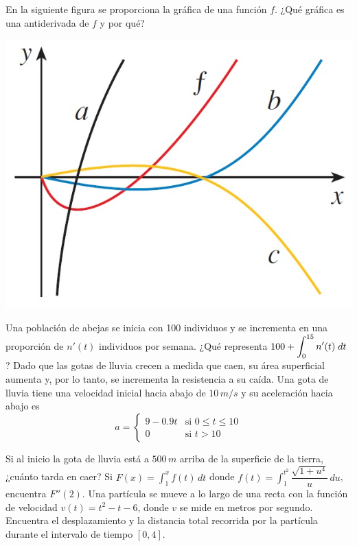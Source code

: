 \documentclass[12pt]{exam}
\begin{document}
\begin{questions}
    \question En la siguiente figura se proporciona la gráfica de una función $f$. ¿Qué gráfica es una antiderivada de $f$ y por qué?
    \begin{center}
      \includegraphics[scale=0.55]{curvas antiderivadas.jpg}   
    \end{center}
   
\vskip10pt

    \question Una población de abejas se inicia con 100 individuos y se incrementa en una proporción de $n'(t)$ individuos por semana. ¿Qué representa $100+\mathlarger{\int_0^{15}n'(t)\;dt}$?
    \vskip10pt
    \question Dado que las gotas de lluvia crecen a medida que caen, su área superficial aumenta y, por lo tanto, se incrementa la resistencia a su caída. Una gota de lluvia tiene una velocidad inicial hacia abajo de \(10\, m/s\) y su aceleración hacia abajo es
$$ a = \begin{cases} 9-0.9t & \text{si } 0\leq t \leq 10 \\0 & \text{si } t > 10\end{cases} $$

Si al inicio la gota de lluvia está a $500\, m$ arriba de la superficie de la tierra, ¿cuánto tarda en caer?
 \vskip12pt   
    \question Si $F(x)=\displaystyle \int_1^x f(t)\,dt$ donde $f(t)=\displaystyle \int_1^{t^2}\dfrac{\sqrt{1+u^4}}{u}\,du$, encuentra $F''(2)$.
\vskip12pt
\question Una partícula se mueve a lo largo de una recta con la función de velocidad $v(t)=t^2-t-6$, donde $v$ se mide en metros por segundo. Encuentra el desplazamiento y la distancia total recorrida por la partícula durante el intervalo de tiempo $[0,4]$.
    
    \end{questions}{}
\end{document}
